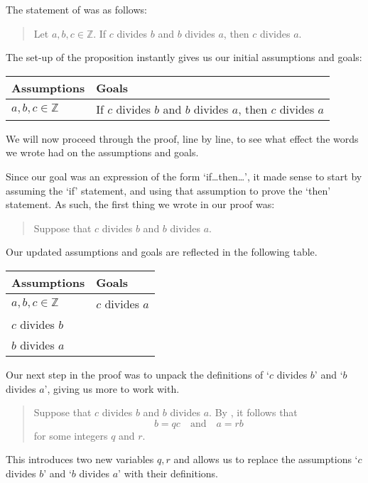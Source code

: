 \begin{example}
\label{exAssumptionsGoals}
The statement of  was as follows:
\begin{quote}
Let $a,b,c \in \mathbb{Z}$. If $c$ divides $b$ and $b$ divides $a$, then $c$ divides $a$.
\end{quote}
The set-up of the proposition instantly gives us our initial assumptions and goals:
\begin{center}
\begin{tabular}{C{150pt}|C{150pt}}
\textbf{Assumptions} & \textbf{Goals} \\ \hline
$a,b,c \in \mathbb{Z}$ & If $c$ divides $b$ and $b$ divides $a$, then $c$ divides $a$
\end{tabular}
\end{center}
We will now proceed through the proof, line by line, to see what effect the words we wrote had on the assumptions and goals.

Since our goal was an expression of the form `if\dots{}then\dots{}', it made sense to start by assuming the `if' statement, and using that assumption to prove the `then' statement. As such, the first thing we wrote in our proof was:
\begin{quote}
Suppose that $c$ divides $b$ and $b$ divides $a$.
\end{quote}
Our updated assumptions and goals are reflected in the following table.
\begin{center}
\begin{tabular}{C{150pt}|C{150pt}}
\textbf{Assumptions} & \textbf{Goals} \\ \hline
$a,b,c \in \mathbb{Z}$ & $c$ divides $a$ \\
$c$ divides $b$ & \\
$b$ divides $a$ & 
\end{tabular}
\end{center}

Our next step in the proof was to unpack the definitions of `$c$ divides $b$' and `$b$ divides $a$', giving us more to work with.

\begin{quote}
{\color{gray} Suppose that $c$ divides $b$ and $b$ divides $a$.} By , it follows that
\[
b=qc \quad \text{and} \quad a=rb
\]
for some integers $q$ and $r$.
\end{quote}

This introduces two new variables $q,r$ and allows us to replace the assumptions `$c$ divides $b$' and `$b$ divides $a$' with their definitions.


\end{example}
